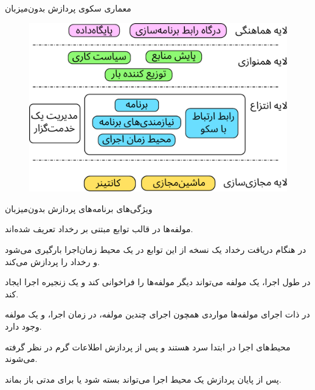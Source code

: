 \begin{frame}{معماری سکوی پردازش بدون‌میزبان}
	\begin{figure}[!h]
		\centering
		\includegraphics[width=0.5\linewidth]{res/serverless_architecture.pdf}
	\end{figure}
\end{frame}

\begin{frame}{ویژگی‌های برنامه‌های پردازش بدون‌میزبان}
	\begin{itemize}\RTList
	 مولفه‌ها در قالب توابع مبتنی بر رخداد تعریف شده‌اند.
		
	 در هنگام دریافت رخداد یک نسخه از این توابع در یک محیط زمان‌اجرا بارگیری می‌شود و رخداد را پردازش می‌کند.
	
	 در طول اجرا، یک مولفه  می‌تواند دیگر مولفه‌ها را فراخوانی کند و یک زنجیره اجرا ایجاد کند.
		
	 در ذات اجرای مولفه‌ها مواردی همچون  اجرای چندین مولفه،  در زمان اجرا،
		 و  یک مولفه وجود دارد. 
		
	 محیط‌های اجرا در ابتدا سرد هستند و پس از پردازش اطلاعات گرم در نظر گرفته می‌شوند.

	 پس از پایان پردازش یک محیط اجرا می‌تواند بسته شود یا برای مدتی باز بماند.
			\end{itemize}
\end{frame}

